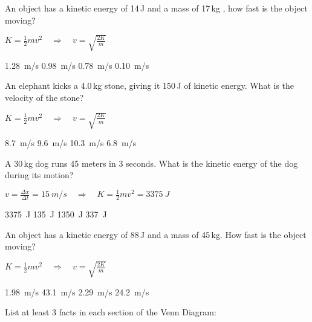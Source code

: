 \documentclass[]{exam}
\begin{document}
\begin{questions}
\question %
An object has a kinetic energy of 14\,J and a mass of 17\,kg , how fast is the object moving? 

\ifprintanswers
{\color{red}
$K = \frac{1}{2} m v^2 \quad \Rightarrow \quad v = \sqrt{\frac{2K}{m}}$
}
\fi

\begin{randomizechoices}
    \correctchoice \SI{1.28}{m/s}
    \choice \SI{0.98}{m/s}
    \choice \SI{0.78}{m/s}
    \choice \SI{0.10}{m/s}
\end{randomizechoices}



\question %
An elephant kicks a 4.0\,kg stone, giving it 150\,J of kinetic energy. What is the velocity of the stone? 

\ifprintanswers
{\color{red}
$K = \frac{1}{2} m v^2 \quad \Rightarrow \quad v = \sqrt{\frac{2K}{m}}$
}
\fi

\begin{randomizechoices}
    \correctchoice \SI{8.7}{m/s}
    \choice \SI{9.6}{m/s}
    \choice \SI{10.3}{m/s}
    \choice \SI{6.8}{m/s}
\end{randomizechoices}


\question %
A 30\,kg dog runs 45 meters in 3 seconds. What is the kinetic energy of the dog during its motion?

\ifprintanswers
{\color{red}  $v = \frac{\Delta x}{\Delta t} = \SI{15}{m/s} \quad \Rightarrow \quad K = \frac{1}{2}mv^2 = \SI{3375}{J}$}
\fi

\begin{randomizechoices}
    \correctchoice \SI{3375}{J}
    \choice \SI{135}{J}
    \choice \SI{1350}{J}
    \choice \SI{337}{J}
\end{randomizechoices}


\question %
An object has a kinetic energy of 88\,J and a mass of 45\,kg. How fast is the object moving?

\ifprintanswers
{\color{red}
$K = \frac{1}{2} m v^2 \quad \Rightarrow \quad v = \sqrt{\frac{2K}{m}}$
}
\fi

\begin{randomizechoices}
    \correctchoice \SI{1.98}{m/s}
    \choice \SI{43.1}{m/s}
    \choice \SI{2.29}{m/s}
    \choice \SI{24.2}{m/s}
\end{randomizechoices}


\ifprintanswers
\else
\clearpage
\fi

\question %
List at least 3 facts in each section of the Venn Diagram:


\end{questions}
\end{document}
